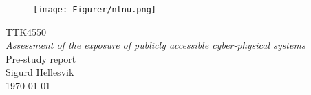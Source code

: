 \documentclass{article}
\begin{document}
\begin{titlepage}
      \begin{center}
        \begin{figure}[h!]
            \centering
            \texttt{[image: Figurer/ntnu.png]}
            \label{fig:ntnu}
        \end{figure} 
        \vspace*{1cm}
        {\Large{TTK4550}}\\[0.4cm] 
        {\Large{\textit{Assessment of the exposure of publicly accessible cyber-physical systems }}}\\[0.5cm]
        {\Huge{Pre-study report}}\\[0.5cm] 
        {\Large{Sigurd Hellesvik}}\\[0.4cm] %
        \large{\today}
        \vspace{1cm}
    \end{center}
    \vspace*{\fill}
\end{titlepage}


\thispagestyle{empty} %
\linespread{1.15}
\newpage
\tableofcontents{}
\def\tableofcontentsname{test}
\thispagestyle{empty} %


\setcounter{page}{1}











\newpage
\begin{appendices} \label{appendix}


\end{appendices}


\newpage
{}

\end{document}
